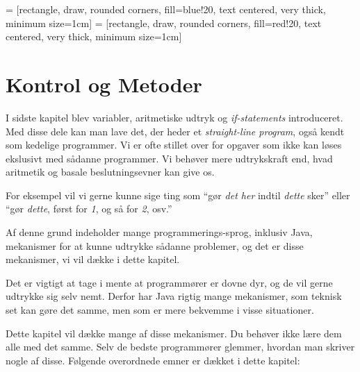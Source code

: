 

\usetikzlibrary{shapes,arrows,graphs}

  = [rectangle, draw, rounded corners, fill=blue!20, text centered, very thick, minimum size=1cm]
 = [rectangle, draw, rounded corners, fill=red!20,  text centered, very thick, minimum size=1cm]



\chapter{Kontrol og Metoder}


    I sidste kapitel blev variabler, aritmetiske udtryk og
    \emph{if-statements} introduceret. Med disse dele kan man lave det,
    der heder et \emph{straight-line program}, også kendt som kedelige
    programmer. Vi er ofte stillet over for opgaver som ikke kan
    løses ekslusivt med sådanne programmer. Vi behøver mere
    udtrykskraft end, hvad aritmetik og basale beslutningsevner kan
    give os.

    For eksempel vil vi gerne kunne sige ting som ``gør \emph{det her} indtil
	\emph{dette} sker'' eller ``gør \emph{dette}, først for \emph{1}, og så for
	\emph{2}, osv.''

	Af denne grund indeholder mange programmerings-sprog, inklusiv Java,
	mekanismer for at kunne udtrykke sådanne problemer, og det er disse
	mekanismer, vi vil dække i dette kapitel.

	Det er vigtigt at tage i mente at programmører er dovne dyr, og de vil gerne
	udtrykke sig selv nemt. Derfor har Java rigtig mange mekanismer, som teknisk
	set kan gøre det samme, men som er mere bekvemme i visse situationer.

    Dette kapitel vil dække mange af disse mekanismer. Du behøver ikke
    lære dem alle med det samme. Selv de bedste programmører glemmer,
    hvordan man skriver nogle af disse. Følgende overordnede emner er
    dækket i dette kapitel:

